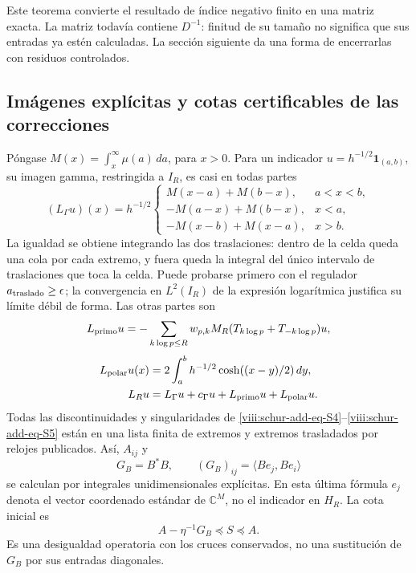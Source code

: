 Este teorema convierte el resultado de índice negativo finito en una matriz exacta. La matriz todavía contiene \(D^{-1}\): finitud de su tamaño no
significa que sus entradas ya estén calculadas. La sección siguiente
da una forma de encerrarlas con residuos controlados.

\subsection{Imágenes explícitas y cotas certificables de las correcciones}
\label{viii:schur-add-sub-148}

Póngase \(M(x)=\int_x^\infty\mu(a)\,da\), para \(x>0\).
Para un indicador \(u=h^{-1/2}\mathbf1_{(a,b)}\), su imagen gamma,
restringida a \(I_R\), es casi en todas partes
\begin{equation}
(L_\Gamma u)(x)=h^{-1/2}
\begin{cases}
M(x-a)+M(b-x),&a<x<b,\\
-M(a-x)+M(b-x),&x<a,\\
-M(x-b)+M(x-a),&x>b.
\end{cases}
\label{viii:schur-add-eq-S4}
\end{equation}
La igualdad se obtiene integrando las dos traslaciones: dentro de la
celda queda una cola por cada extremo, y fuera queda la integral del
único intervalo de traslaciones que toca la celda. Puede probarse primero
con el regulador \(a_{\rm traslado}\geq\epsilon\); la convergencia en
\(L^2(I_R)\) de la expresión logarítmica justifica su límite débil de
forma. Las otras partes son
\begin{equation}
L_{\rm primo}u=-\sum_{k\log p\leq R}w_{p,k}
M_R(T_{k\log p}+T_{-k\log p})u,
\label{viii:schur-add-display-11}
\end{equation}
\begin{equation}
\begin{aligned}
L_{\rm polar}u(x)&=2\int_a^b h^{-1/2}\cosh((x-y)/2)\,dy,\\
L_Ru&=L_\Gamma u+c_\Gamma u+L_{\rm primo}u+L_{\rm polar}u.
\end{aligned}
\label{viii:schur-add-eq-S5}
\end{equation}
Todas las discontinuidades y singularidades de \eqref{viii:schur-add-eq-S4}--\eqref{viii:schur-add-eq-S5} están en una
lista finita de extremos y extremos trasladados por relojes publicados.
Así, \(A_{ij}\) y
\begin{equation}
G_B=B^*B,\qquad (G_B)_{ij}=\langle Be_j,Be_i\rangle
\label{viii:schur-add-display-13}
\end{equation}
se calculan por integrales unidimensionales explícitas. En esta última
fórmula \(e_j\) denota el vector coordenado estándar de
\(\mathbb C^M\), no el indicador en \(H_R\).
La cota inicial es
\begin{equation}
A-\eta^{-1}G_B\preceq S\preceq A.
\label{viii:schur-add-eq-S6}
\end{equation}
Es una desigualdad operatoria con los cruces conservados, no una
sustitución de \(G_B\) por sus entradas diagonales.


